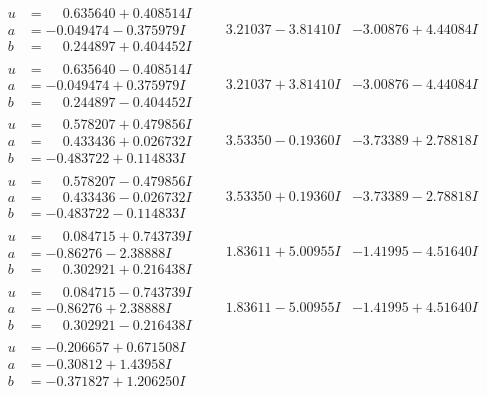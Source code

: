 \documentclass[1p]{elsarticle_modified}
\theoremstyle{definition}
\begin{document}
$$\begin{array}{c|c|c}
\begin{aligned}
u &= \phantom{-}0.635640 + 0.408514 I \\
a &= -0.049474 - 0.375979 I \\
b &= \phantom{-}0.244897 + 0.404452 I\end{aligned}
 & \phantom{-}3.21037 - 3.81410 I & -3.00876 + 4.44084 I \\ \hline\begin{aligned}
u &= \phantom{-}0.635640 - 0.408514 I \\
a &= -0.049474 + 0.375979 I \\
b &= \phantom{-}0.244897 - 0.404452 I\end{aligned}
 & \phantom{-}3.21037 + 3.81410 I & -3.00876 - 4.44084 I \\ \hline\begin{aligned}
u &= \phantom{-}0.578207 + 0.479856 I \\
a &= \phantom{-}0.433436 + 0.026732 I \\
b &= -0.483722 + 0.114833 I\end{aligned}
 & \phantom{-}3.53350 - 0.19360 I & -3.73389 + 2.78818 I \\ \hline\begin{aligned}
u &= \phantom{-}0.578207 - 0.479856 I \\
a &= \phantom{-}0.433436 - 0.026732 I \\
b &= -0.483722 - 0.114833 I\end{aligned}
 & \phantom{-}3.53350 + 0.19360 I & -3.73389 - 2.78818 I \\ \hline\begin{aligned}
u &= \phantom{-}0.084715 + 0.743739 I \\
a &= -0.86276 - 2.38888 I \\
b &= \phantom{-}0.302921 + 0.216438 I\end{aligned}
 & \phantom{-}1.83611 + 5.00955 I & -1.41995 - 4.51640 I \\ \hline\begin{aligned}
u &= \phantom{-}0.084715 - 0.743739 I \\
a &= -0.86276 + 2.38888 I \\
b &= \phantom{-}0.302921 - 0.216438 I\end{aligned}
 & \phantom{-}1.83611 - 5.00955 I & -1.41995 + 4.51640 I \\ \hline\begin{aligned}
u &= -0.206657 + 0.671508 I \\
a &= -0.30812 + 1.43958 I \\
b &= -0.371827 + 1.206250 I\end{aligned}

\end{array}$$
\end{document}

